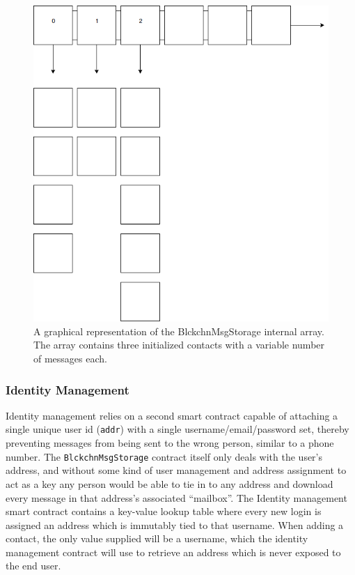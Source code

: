 \documentclass[titlepage]{report}
\begin{document}
\begin{figure}[tph!]
    \centering
    \includegraphics[width=0.7\linewidth]{message_storage}
    \caption{A graphical representation of the BlckchnMsgStorage internal array. The array contains three initialized contacts with a variable number of messages each.}
    \label{fig:messagestorage}
\end{figure}

\subsubsection{Identity Management}
\gls{Identity management} relies on a second \gls{smart contract} capable of attaching a single unique user id (\texttt{addr}) with a single username/email/password set, thereby preventing messages from being sent to the wrong person, similar to a phone number. The \texttt{BlckchnMsgStorage} contract itself only deals with the user's address, and without some kind of user management and address assignment to act as a key any person would be able to tie in to any address and download every message in that address's associated ``mailbox''. The \gls{Identity management} smart contract contains a key-value lookup table where every new login is assigned an address which is immutably tied to that username. When adding a contact, the only value supplied will be a username, which the identity management contract will use to retrieve an address which is never exposed to the end user.
\end{document}
